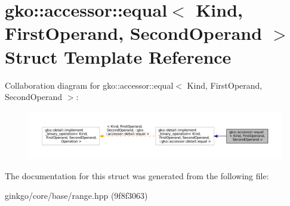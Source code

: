 \hypertarget{structgko_1_1accessor_1_1equal}{}\section{gko\+:\+:accessor\+:\+:equal$<$ Kind, First\+Operand, Second\+Operand $>$ Struct Template Reference}
\label{structgko_1_1accessor_1_1equal}


Collaboration diagram for gko\+:\+:accessor\+:\+:equal$<$ Kind, First\+Operand, Second\+Operand $>$\+:
\nopagebreak
\begin{figure}[H]
\begin{center}
\leavevmode
\includegraphics[width=350pt]{structgko_1_1accessor_1_1equal__coll__graph}
\end{center}
\end{figure}


The documentation for this struct was generated from the following file\+:\begin{DoxyCompactItemize}
\item 
ginkgo/core/base/range.\+hpp (9f8f3063)\end{DoxyCompactItemize}

